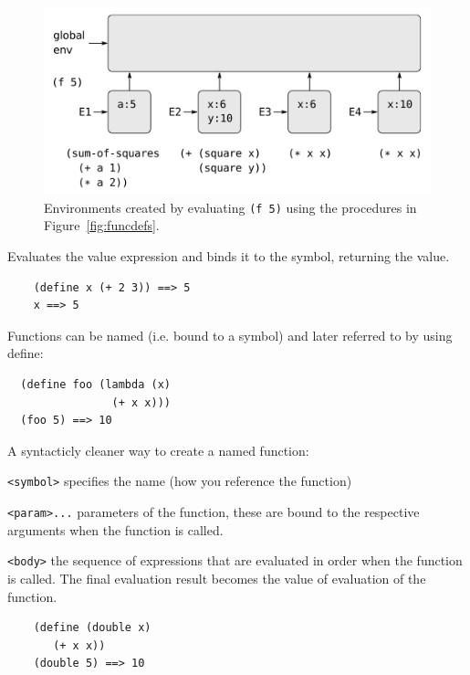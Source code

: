 \documentclass[12pt]{article}
\begin{document}
\begin{figure}[htbp] %
   \centering
   \includegraphics[width=5in]{function_invocations.png} 
\caption[Invocation Environments]{Environments created by evaluating
  {\tt (f 5)} using the procedures in Figure~\ref{fig:funcdefs}.}
\label{fig:funcinvocations}
\end{figure}



Evaluates the value expression and binds it to the symbol, returning
the value. 

\begin{verbatim}
    (define x (+ 2 3)) ==> 5
    x ==> 5
\end{verbatim}

Functions can be named (i.e. bound to a symbol) and later referred to
by using define:

\begin{verbatim}
  (define foo (lambda (x) 
                (+ x x)))
  (foo 5) ==> 10  
\end{verbatim}



A syntacticly cleaner way to create a named function:

\verb|<symbol>| specifies the name (how you reference the function)

\verb|<param>...| parameters of the function, these are bound to the
respective arguments when the function is called. 

\verb|<body>| the sequence of expressions that are evaluated in order
when the function is called. The final evaluation result becomes the
value of evaluation of the function. 

\begin{verbatim}
    (define (double x)
       (+ x x))
    (double 5) ==> 10
\end{verbatim}
\end{document}
